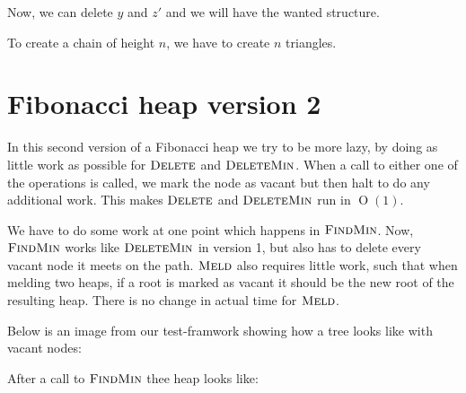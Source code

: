 \documentclass[oneside,11pt,openright]{report}
\newcommand{\BigO}[1]{\ensuremath{\operatorname{O}\left(#1\right)}}
\newcommand{\adjustimg}{%
  \ifodd\value{page}\hspace*{\dimexpr\evensidemargin-\oddsidemargin}\else\hspace*{-\dimexpr\evensidemargin-\oddsidemargin}\fi%
}
\newcommand{\centerimg}[2][width=\textwidth]{%
  \makebox[\textwidth]{\adjustimg\texttt{[image: \#2]}}%
}
\newcommand{\FindMin}{\textsc{FindMin}}
\newcommand{\DeleteMin}{\textsc{DeleteMin}}
\newcommand{\Delete}{\textsc{Delete}}
\newcommand{\Meld}{\textsc{Meld}}
\begin{document}
Now, we can delete $y$ and $z'$ and we will have the wanted structure. 

\begin{center}
\end{center}

To create a chain of height $n$, we have to create $n$ triangles.

\section{Fibonacci heap version 2}

In this second version of a Fibonacci heap we try to be more lazy, by doing as little work as possible for $\Delete$ and $\DeleteMin$. When a call to either one of the operations is called, we mark the node as vacant but then halt to do any additional work. This makes $\Delete$ and $\DeleteMin$ run in $\BigO{1}$.

We have to do some work at one point which happens in $\FindMin$. Now, $\FindMin$ works like $\DeleteMin$ in version 1, but also has to delete every vacant node it meets on the path. $\Meld$ also requires little work, such that when melding two heaps, if a root is marked as vacant it should be the new root of the resulting heap. There is no change in actual time for $\Meld$.

Below is an image from our test-framwork showing how a tree looks like with vacant nodes:

\mbox{} \par
\noindent\centerimg{delete_39}
After a call to $\FindMin$ thee heap looks like:

\mbox{} \par
\noindent\centerimg{find_min}
\end{document}
